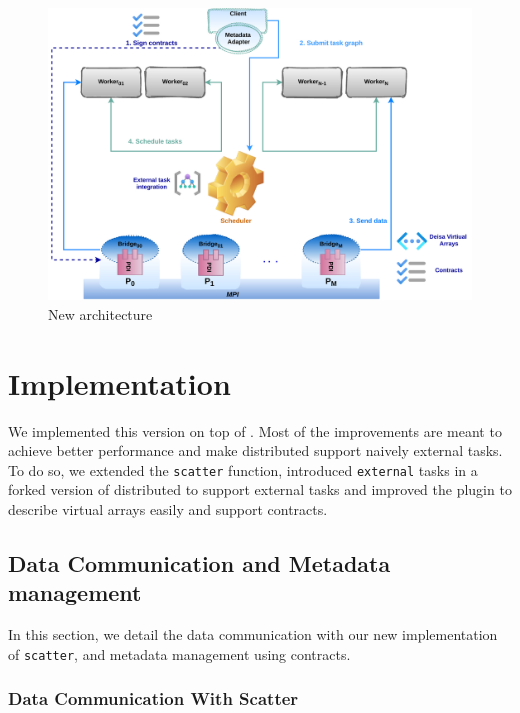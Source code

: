 \begin{figure}[h!]\centering
\includegraphics[width=\columnwidth]{figures/DeisaV2.pdf}
\caption{New \deisa architecture}
\label{figdeidav2}
\end{figure}

\section{Implementation}

We implemented this version on top of \deisa. Most of the improvements are meant to achieve better performance and make \dask distributed support naively external tasks. 
To do so, we extended the \texttt{scatter} function, introduced \texttt{external} tasks in a forked version of \dask distributed to support external tasks and improved the \deisa plugin to describe virtual arrays easily and support contracts. 


\subsection{Data Communication and Metadata management}
In this section, we detail the data communication with our new implementation of \texttt{scatter}, and metadata management using contracts.
\subsubsection{Data Communication With Scatter}\label{sec:datacommscatter}


